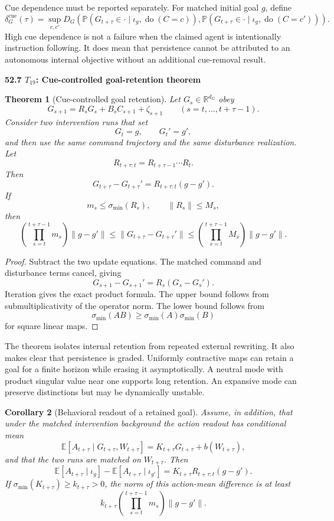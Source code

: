 \documentclass[11pt,letterpaper]{article}
\newcommand{\subtopic}[1]{%
 \vspace{0.45em}
 {\bfseries\color{AccentColor} #1\par}
}
\theoremstyle{plain}
\newtheorem{theorem}{Theorem}
\newtheorem{corollary}[theorem]{Corollary}
\theoremstyle{definition}
\begin{document}
Cue dependence must be reported separately. For matched initial goal \(g\),
define
\[
\delta_G^{\mathrm{cue}}(\tau)
=
\sup_{c,c'}
D_G
\left(
\mathbb P(G_{t+\tau}\in\cdot\mid\iota_g,\operatorname{do}(C=c)),
\mathbb P(G_{t+\tau}\in\cdot\mid\iota_g,\operatorname{do}(C=c'))
\right).
\]
High cue dependence is not a failure when the claimed agent is intentionally
instruction following. It does mean that persistence cannot be attributed to
an autonomous internal objective without an additional cue-removal result.

\subtopic{52.7 \(T_{19}\): Cue-controlled goal-retention theorem }

\begin{theorem}[Cue-controlled goal retention]
\label{thm:goal-retention}
Let \(G_s\in\mathbb R^{d_G}\) obey
\[
G_{s+1}
=
R_sG_s+B_sC_{s+1}+\zeta_{s+1}
\qquad
(s=t,\ldots,t+\tau-1).
\]
Consider two intervention runs that set
\[
G_t=g,
\qquad
G_t'=g',
\]
and then use the same command trajectory and the same disturbance realization.
Let
\[
R_{t+\tau:t}
=
R_{t+\tau-1}\cdots R_t.
\]
Then
\[
\boxed{
G_{t+\tau}-G_{t+\tau}'
=
R_{t+\tau:t}(g-g').
}
\]
If
\[
m_s
\leq
\sigma_{\min}(R_s),
\qquad
\|R_s\|\leq M_s,
\]
then
\[
\boxed{
\left(
\prod_{s=t}^{t+\tau-1}m_s
\right)
\|g-g'\|
\leq
\|G_{t+\tau}-G_{t+\tau}'\|
\leq
\left(
\prod_{s=t}^{t+\tau-1}M_s
\right)
\|g-g'\|.
}
\]
\end{theorem}

\begin{proof}
Subtract the two update equations. The matched command and disturbance terms
cancel, giving
\[
G_{s+1}-G_{s+1}'
=
R_s(G_s-G_s').
\]
Iteration gives the exact product formula. The upper bound follows from
submultiplicativity of the operator norm. The lower bound follows from
\[
\sigma_{\min}(AB)
\geq
\sigma_{\min}(A)\sigma_{\min}(B)
\]
for square linear maps.
\end{proof}

The theorem isolates internal retention from repeated external rewriting. It
also makes clear that persistence is graded. Uniformly contractive maps can
retain a goal for a finite horizon while erasing it asymptotically. A neutral
mode with product singular value near one supports long retention. An
expansive mode can preserve distinctions but may be dynamically unstable.

\begin{corollary}[Behavioral readout of a retained goal]
\label{cor:goal-action-readout}
Assume, in addition, that under the matched intervention background the action
readout has conditional mean
\[
\mathbb E[A_{t+\tau}\mid G_{t+\tau},W_{t+\tau}]
=
K_{t+\tau}G_{t+\tau}+b(W_{t+\tau}),
\]
and that the two runs are matched on \(W_{t+\tau}\). Then
\[
\mathbb E[A_{t+\tau}\mid\iota_g]
-
\mathbb E[A_{t+\tau}\mid\iota_{g'}]
=
K_{t+\tau}R_{t+\tau:t}(g-g').
\]
If \(\sigma_{\min}(K_{t+\tau})\geq k_{t+\tau}>0\), the norm of this action-mean
difference is at least
\[
k_{t+\tau}
\left(
\prod_{s=t}^{t+\tau-1}m_s
\right)
\|g-g'\|.
\]
\end{corollary}
\end{document}
